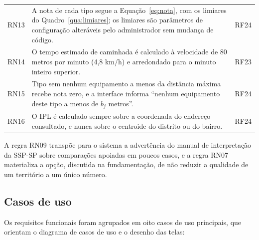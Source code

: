 \begin{longtable}{C{1.2cm}L{10.6cm}L{2.6cm}}
	RN13        & A nota de cada tipo segue a Equação~\ref{eq:nota}, com os limiares do Quadro~\ref{qua:limiares}; os limiares são parâmetros de configuração alteráveis pelo administrador sem mudança de código.                                                                      & RF24                   \\
	RN14        & O tempo estimado de caminhada é calculado à velocidade de 80 metros por minuto (4,8 km/h) e arredondado para o minuto inteiro superior.                                                                                                                               & RF23                   \\
	RN15        & Tipo sem nenhum equipamento a menos da distância máxima recebe nota zero, e a interface informa ``nenhum equipamento deste tipo a menos de $b_j$ metros''.                                                                                                            & RF24                   \\
	RN16        & O IPL é calculado sempre sobre a coordenada do endereço consultado, e nunca sobre o centroide do distrito ou do bairro.                                                                                                                                               & RF24                   \\
\end{longtable}
\vspace{-0.4cm}

A regra RN09 transpõe para o sistema a advertência do manual de interpretação da SSP-SP sobre comparações apoiadas em poucos casos, e a regra RN07 materializa a opção, discutida na fundamentação, de não reduzir a qualidade de um território a um único número.

\subsection{Casos de uso}

Os requisitos funcionais foram agrupados em oito casos de uso principais, que orientam o diagrama de casos de uso e o desenho das telas:

